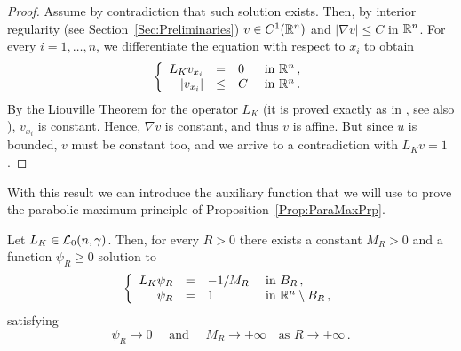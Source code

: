 \begin{proof}
Assume by contradiction that such solution exists. Then, by interior regularity (see Section~\ref{Sec:Preliminaries}) $v\in C^1(\mathbb{R}^n)$ and $|\nabla v|\leq C$ in $\mathbb{R}^n$. For every $i = 1,\ldots, n$, we differentiate the equation with respect to $x_i$ to obtain
\begin{equation*}
\left\{\begin{array}{rcll}
L_K  v_{x_i} &=& 0 & \textrm{ in } \mathbb{R}^n\,,\\
|v_{x_i}| &\leq& C & \textrm{ in } \mathbb{R}^n\,.
\end{array} \right.
\end{equation*}
By the Liouville Theorem for the operator $L_K $ (it is proved exactly as in \cite{RosOtonSerra-Stable}, see also \cite{SerraC2s+alphaRegularity}), $v_{x_i}$ is constant. Hence, $\nabla v$ is constant, and thus $v$ is affine. But since $u$ is bounded, $v$ must be constant too, and we arrive to a contradiction with $L_K v=1$.
\end{proof}

With this result we can introduce the auxiliary function that we will use to prove the parabolic maximum principle of Proposition~\ref{Prop:ParaMaxPrp}.

\begin{lemma}
	\label{Lemma:SolBallToZero}
	Let $L_K \in \mathcal{L}_0(n,\gamma)$. Then, for every $R>0$ there exists a constant $M_R>0$ and a function $\psi_R\geq 0$ solution to
	\begin{equation*}
	\left\{\begin{array}{rcll}
	L_K  \psi_R &=& -1/M_R & \textrm{ in } B_R\,,\\
	\psi_R &=& 1 & \textrm{ in } \mathbb{R}^n\setminus B_R\,,
	\end{array} \right.
	\end{equation*}
	satisfying 
	$$
	 \psi_R \to  0 \quad \text{ and } \quad M_R  \to +\infty \quad \text{as } R\to +\infty\,.
	$$
\end{lemma}

